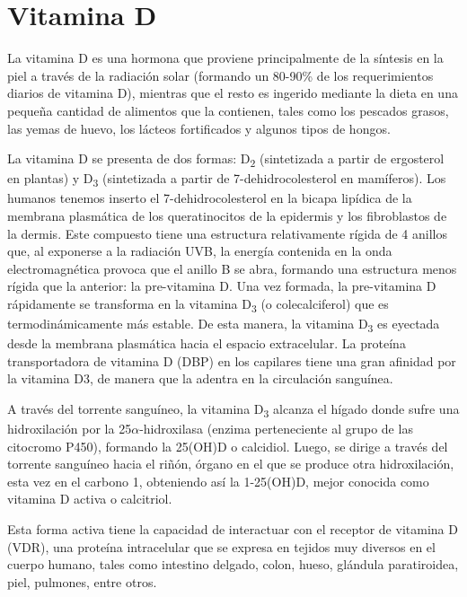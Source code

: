 \section*{Vitamina D}

La vitamina D es una hormona que proviene principalmente de la síntesis en la piel a través de la radiación solar (formando un 80-90\% de los requerimientos diarios de vitamina D), mientras que el resto es ingerido mediante la dieta en una pequeña cantidad de alimentos que la contienen, tales como los pescados grasos, las yemas de huevo, los lácteos fortificados y algunos tipos de hongos\cite{Holick_2010}.

La vitamina D se presenta de dos formas: D\textsubscript{2} (sintetizada a partir de ergosterol en plantas) y D\textsubscript{3} (sintetizada a partir de 7-dehidrocolesterol en mamíferos). Los humanos tenemos inserto el 7-dehidrocolesterol en la bicapa lipídica de la membrana plasmática de los queratinocitos de la epidermis y los fibroblastos de la dermis\cite{zuluga_2011}. Este compuesto tiene una estructura relativamente rígida de 4 anillos que, al exponerse a la radiación UVB, la energía contenida en la onda electromagnética provoca que el anillo B se abra, formando una estructura menos rígida que la anterior: la pre-vitamina D. Una vez formada, la pre-vitamina D rápidamente se transforma en la vitamina D\textsubscript{3} (o colecalciferol) que es termodinámicamente más estable. De esta manera, la vitamina D\textsubscript{3} es eyectada desde la membrana plasmática hacia el espacio extracelular. La proteína transportadora de vitamina D (DBP) en los capilares tiene una gran afinidad por la vitamina D3, de manera que la adentra en la circulación sanguínea\cite{Holick_1989}.

A través del torrente sanguíneo, la vitamina D\textsubscript{3} alcanza el hígado donde sufre una hidroxilación por la 25$\alpha$-hidroxilasa (enzima perteneciente al grupo de las citocromo P450), formando la 25(OH)D o calcidiol. Luego, se dirige a través del torrente sanguíneo hacia el riñón, órgano en el que se produce otra hidroxilación, esta vez en el carbono 1, obteniendo así la 1-25(OH)D, mejor conocida como vitamina D activa o calcitriol\cite{zuluga_2011}.

Esta forma activa tiene la capacidad de interactuar con el receptor de vitamina D (VDR), una proteína intracelular que se expresa en tejidos muy diversos en el cuerpo humano, tales como intestino delgado, colon, hueso, glándula paratiroidea,  piel, pulmones, entre otros.\cite{Pike_2017}

